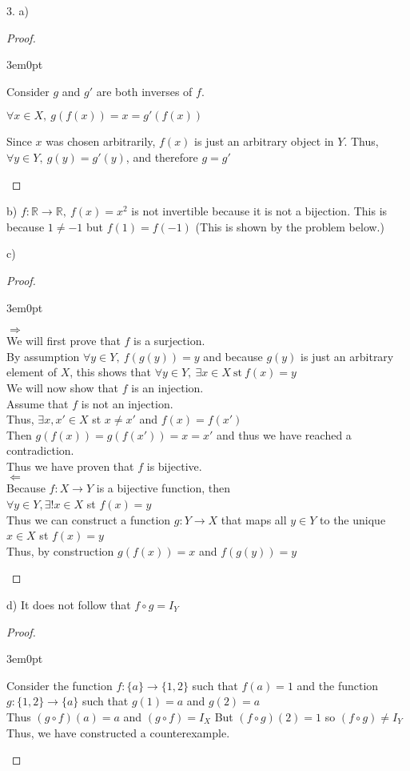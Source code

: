 \documentclass[11pt]{article}
\newcommand{\bproof}{\begin{proof}
$ $ \\
\begin{adjustwidth}{3em}{0pt}
}
\newcommand{\eproof}{\end{adjustwidth}
\end{proof}}
\begin{document}
\begin{flushleft}
3. a)
\bproof

Consider $ g $ and $ g' $ are both inverses of $f$. \\
\begin{center}
 $\forall x \in X, \ g(f(x)) = x = g'(f(x))$ \\
\end{center}
Since $x$ was chosen arbitrarily, $f(x)$ is just an arbitrary object in $Y$. 
Thus, $ \forall y \in Y, \  g(y) = g'(y)$, and therefore $g = g'$

\eproof

b) $f:\mathbb{R} \rightarrow \mathbb{R}, \ f(x) = x^2$ is not invertible because it is not a bijection. This is because $1 \neq -1$ but $f(1) = f(-1)$ (This is shown by the problem below.)

\bigskip

c) 
\bproof
$\Rightarrow$ \\
We will first prove that $f$ is a surjection. \\
By assumption $\forall y \in Y, \ f(g(y)) = y$ and because $g(y)$ is just an arbitrary element of $X$, this shows that $\forall y \in Y, \ \exists x \in X \ \text{st} \ f(x) = y$ \newline
\\
We will now show that $f$ is an injection. \\
Assume that $f$ is not an injection. \\
Thus, $\exists x, x' \in X$ st $x \neq x'$ and $f(x) = f(x')$ \\
Then $g(f(x)) = g(f(x')) = x = x'$ and thus we have reached a contradiction. \newline
\\
Thus we have proven that $f$ is bijective. \newline
\\
$\Leftarrow$ \\
Because $f:X \rightarrow Y$ is a bijective function, then \\
$\forall y \in Y, \exists ! x \in X$ st $f(x) = y$ \\
Thus we can construct a function $g: Y \rightarrow X$ that maps all $y \in Y$ to the unique $x \in X$ st $f(x) = y$ \\
Thus, by construction $g(f(x)) = x$ and $f(g(y)) = y$

\eproof

\bigskip

d) It does not follow that $f \circ g = I_Y$ \\

\bproof
Consider the function $f:\{ a \} \rightarrow \{ 1,2 \}$ such that $f(a) = 1$ 
and the function $g:\{ 1,2 \} \rightarrow \{ a \}$ such that $g(1) = a$ and $g(2) = a$ \\
Thus $(g \circ f)(a) = a$ and $(g \circ f) = I_X$
But $(f \circ g)(2) = 1$ so $(f \circ g) \neq I_Y$ \\
Thus, we have constructed a counterexample.
\eproof


\end{flushleft}
\end{document}
